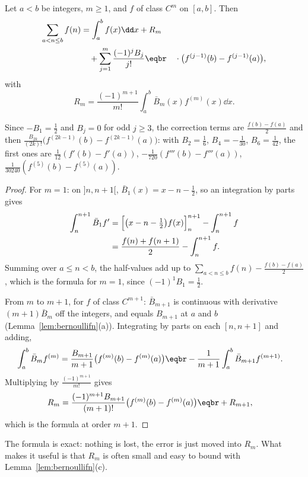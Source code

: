 \begin{theorem}\label{thm:eulermaclaurin}
Let $a<b$ be integers, $m\ge1$, and $f$ of class $C^m$ on $[a,b]$. Then
\[
\begin{aligned}\sum_{a<n\le b}f(n)&=\int_a^bf(x)\dd x+R_m\\&\quad+\sum_{j=1}^m\frac{(-1)^jB_j}{j!}\eqbr\quad\cdot\bigl(f^{(j-1)}(b)-f^{(j-1)}(a)\bigr),\end{aligned}
\]
with
\[
R_m=\frac{(-1)^{m+1}}{m!}\int_a^b\bar B_m(x)f^{(m)}(x)\dd x.
\]
\end{theorem}

Since $-B_1=\frac12$ and $B_j=0$ for odd $j\ge3$, the correction terms are $\frac{f(b)-f(a)}2$ and then
$\frac{B_{2k}}{(2k)!}\bigl(f^{(2k-1)}(b)-f^{(2k-1)}(a)\bigr)$: with $B_2=\frac16$, $B_4=-\frac1{30}$, $B_6=\frac1{42}$, the first ones are
$\frac1{12}(f'(b)-f'(a))$, $-\frac1{720}(f'''(b)-f'''(a))$, $\frac1{30240}(f^{(5)}(b)-f^{(5)}(a))$.

\begin{proof}
For $m=1$: on $]n,n+1[$, $\bar B_1(x)=x-n-\frac12$, so an integration by parts gives
\[
\begin{aligned}\int_n^{n+1}\bar B_1f'&=\Bigl[\bigl(x-n-\tfrac12\bigr)f(x)\Bigr]_n^{n+1}-\int_n^{n+1}f\\&=\frac{f(n)+f(n+1)}2-\int_n^{n+1}f.\end{aligned}
\]
Summing over $a\le n<b$, the half-values add up to $\sum_{a<n\le b}f(n)-\frac{f(b)-f(a)}2$, which is the formula for $m=1$, since $(-1)^1B_1=\frac12$.

From $m$ to $m+1$, for $f$ of class $C^{m+1}$: $\bar B_{m+1}$ is continuous with derivative $(m+1)\bar B_m$ off the integers, and equals $B_{m+1}$ at
$a$ and $b$ (Lemma~\ref{lem:bernoullifn}(a)). Integrating by parts on each $[n,n+1]$ and adding,
\[
\begin{aligned}\int_a^b\bar B_mf^{(m)}&=\frac{B_{m+1}}{m+1}\bigl(f^{(m)}(b)-f^{(m)}(a)\bigr)\eqbr-\frac1{m+1}\int_a^b\bar B_{m+1}f^{(m+1)}.\end{aligned}
\]
Multiplying by $\frac{(-1)^{m+1}}{m!}$ gives
\[
\begin{aligned}R_m&=\frac{(-1)^{m+1}B_{m+1}}{(m+1)!}\bigl(f^{(m)}(b)-f^{(m)}(a)\bigr)\eqbr+R_{m+1},\end{aligned}
\]
which is the formula at order $m+1$.
\end{proof}

The formula is exact: nothing is lost, the error is just moved into $R_m$. What makes it useful is that $R_m$ is often small and
easy to bound with Lemma~\ref{lem:bernoullifn}(c).

